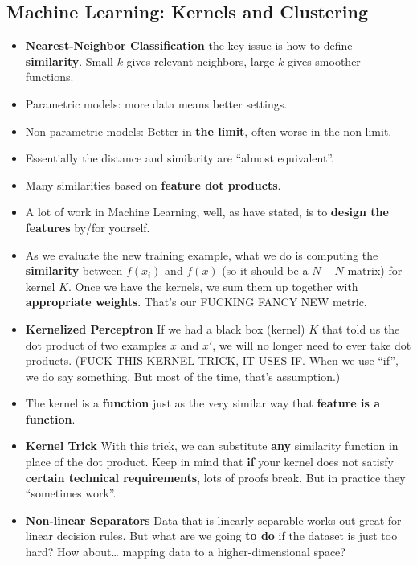 \documentclass[twocolumn]{article}
\begin{document}
\subsection{Machine Learning: Kernels and Clustering}
\label{sec:mach-learn-kern}

\begin{itemize}
\item \textbf{Nearest-Neighbor Classification} the key issue is how to
  define {\color{red}\textbf{similarity}}. Small $k$ gives relevant neighbors,
  large $k$ gives smoother functions.
\item Parametric models: more data means better settings.
\item Non-parametric models: Better in \textbf{the limit}, often worse
  in the non-limit.
\item Essentially the distance and similarity are ``almost
  equivalent''.
\item Many similarities based on \textbf{feature dot products}.
\item A lot of work in Machine Learning, well, as have stated, is to
  \textbf{design the features} by/for yourself.
\item As we evaluate the new training example, what we do is computing
  the \textbf{similarity} between $f(x_{i})$ and $f(x)$ (so it should
  be a $N-N$ matrix) for kernel $K$. Once we have the kernels, we sum
  them up together with \textbf{appropriate weights}. That's our
  FUCKING FANCY NEW metric.
\item \textbf{Kernelized Perceptron} If we had a black box (kernel)
  $K$ that told us the dot product of two examples $x$ and $x'$, we
  will no longer need to ever take dot products. (FUCK THIS KERNEL
  TRICK, IT USES IF. When we use ``if'', we do say something. But most
  of the time, that's assumption.)
\item The kernel is a \textbf{function} just as the very similar way
  that \textbf{feature is a function}.
\item \textbf{Kernel Trick} With this trick, we can substitute
  \textbf{any} similarity function in place of the dot product. Keep
  in mind that \textbf{if} your kernel does not satisfy
  \textbf{certain technical requirements}, lots of proofs break. But
  in practice they ``sometimes work''.
\item \textbf{Non-linear Separators} Data that is linearly separable
  works out great for linear decision rules. But what are we going
  \textbf{to do} if the dataset is just too hard? How about\ldots
  mapping data to a higher-dimensional space?

\end{itemize}
\end{document}

